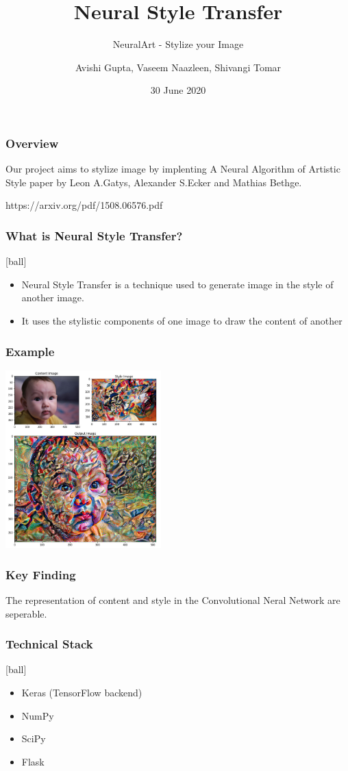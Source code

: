 \documentclass[14pt]{beamer}
\title[NST]{Neural Style Transfer}
\subtitle{NeuralArt - Stylize your Image}
\author[Team - 38]{Avishi Gupta, Vaseem Naazleen, Shivangi Tomar}
\date{30 June 2020}
\begin{document}
\begin{frame}
   \titlepage
\end{frame}

\begin{frame}
		\frametitle{Overview}
		Our project aims to stylize image by implenting A Neural Algorithm of Artistic Style paper by Leon A.Gatys, Alexander S.Ecker and Mathias Bethge.
        
		https://arxiv.org/pdf/1508.06576.pdf
\end{frame}

\begin{frame}
		\frametitle{What is Neural Style Transfer?}
		\begin{itemize}
		\item Neural Style Transfer is a technique used to generate image in the style of another image.
		\item It uses the stylistic components of one image to draw the content of another
		\end{itemize}
\end{frame}

\begin{frame}
    \frametitle{Example}
    \begin{center}
        \includegraphics[width=60mm]{baby.jpeg}
    \end{center}
\end{frame}

\begin{frame}
		\frametitle{Key Finding}
		The representation of content and style in the Convolutional Neral Network are seperable.
\end{frame}

\begin{frame}
		\frametitle{Technical Stack}
		\begin{itemize}
		\item Keras (TensorFlow backend)
		\item NumPy
		\item SciPy
		\item Flask  
		\end{itemize}
\end{frame}
\end{document}
